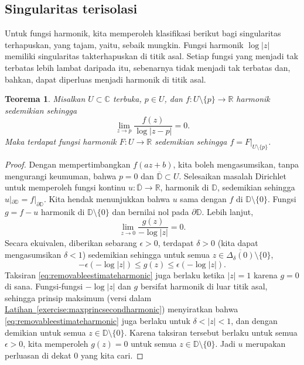 \documentclass[12pt,openany]{book}
\newcommand{\sabs}[1]{\lvert {#1} \rvert}
\newcommand{\C}{{\mathbb{C}}}
\newcommand{\R}{{\mathbb{R}}}
\newcommand{\D}{{\mathbb{D}}}
\theoremstyle{plain}
\newtheorem{thm}{Teorema}[section]
\theoremstyle{remark}
\theoremstyle{definition}
\theoremstyle{exercise}
\theoremstyle{example}
\newcommand{\exerciseref}[1]{\hyperref[#1]{Latihan~\ref*{#1}}}
\begin{document}
\subsection{Singularitas terisolasi}

Untuk fungsi harmonik, kita memperoleh klasifikasi berikut bagi singularitas
terhapuskan, yang tajam, yaitu, sebaik mungkin.
Fungsi harmonik $\log \sabs{z}$
memiliki singularitas takterhapuskan di titik asal.
Setiap fungsi
yang menjadi tak terbatas lebih lambat daripada itu, sebenarnya tidak menjadi tak terbatas dan, bahkan,
dapat diperluas menjadi
harmonik di titik asal.

\begin{thm}
Misalkan $U \subset \C$ terbuka, $p \in U$, dan $f \colon U \setminus \{ p \}
\to \R$ harmonik sedemikian sehingga
\begin{equation*}
\lim_{z\to p} \frac{f(z)}{\log \sabs{z-p}} = 0 .
\end{equation*}
Maka terdapat fungsi harmonik $F \colon U \to \R$ sedemikian sehingga
$f = F|_{U \setminus \{ p \}}$.
\end{thm}

\begin{proof}
Dengan mempertimbangkan $f(a z + b)$, kita boleh mengasumsikan, tanpa mengurangi keumuman,
bahwa $p = 0$ dan $\overline{\D} \subset U$.  Selesaikan masalah Dirichlet
untuk memperoleh fungsi kontinu $u \colon \overline{\D} \to \R$,
harmonik di $\D$, sedemikian sehingga $u|_{\partial \D} = f|_{\partial \D}$.
Kita hendak menunjukkan bahwa $u$ sama dengan $f$ di $\D \setminus \{0\}$.
Fungsi
$g = f - u$ harmonik di $\D \setminus \{ 0 \}$ dan bernilai nol pada
$\partial \D$.  Lebih lanjut,
\begin{equation*}
\lim_{z \to 0} \frac{g(z)}{-\log \sabs{z}} = 0.
\end{equation*}
Secara ekuivalen, diberikan sebarang $\epsilon > 0$, terdapat $\delta > 0$
(kita dapat mengasumsikan $\delta < 1$)
sedemikian sehingga untuk semua $z \in \overline{\Delta_\delta(0)} \setminus \{ 0 \}$,
\begin{equation} \label{eq:removableestimateharmonic}
-\epsilon (- \log\sabs{z})
\leq
g(z)
\leq
\epsilon (- \log\sabs{z}) .
\end{equation}
Taksiran \eqref{eq:removableestimateharmonic} juga berlaku ketika
$\sabs{z}=1$ karena $g=0$ di sana.
Fungsi-fungsi $-\log\sabs{z}$ dan $g$ bersifat harmonik
di luar titik asal, sehingga
prinsip maksimum (versi dalam
\exerciseref{exercise:maxprincsecondharmonic}) menyiratkan bahwa
\eqref{eq:removableestimateharmonic} juga berlaku untuk $\delta < \sabs{z} < 1$,
dan dengan demikian untuk semua $z \in \D \setminus \{ 0 \}$.
Karena taksiran tersebut berlaku untuk semua $\epsilon > 0$, kita memperoleh $g(z) = 0$ untuk semua
$z \in \D \setminus \{0\}$.  Jadi $u$ merupakan perluasan di dekat $0$ yang
kita cari.
\end{proof}
\end{document}

